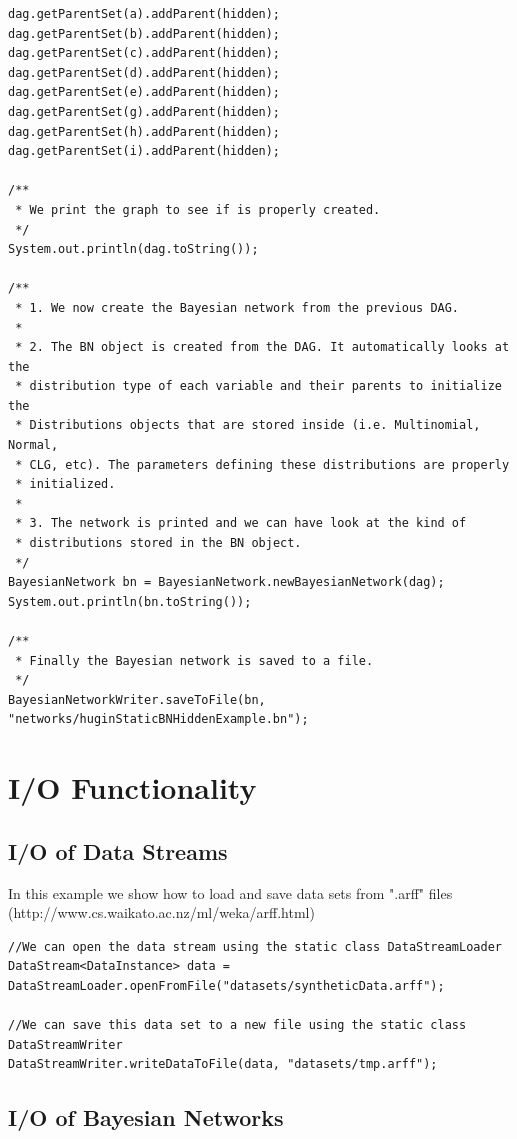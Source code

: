 \begin{lstlisting}
dag.getParentSet(a).addParent(hidden);
dag.getParentSet(b).addParent(hidden);
dag.getParentSet(c).addParent(hidden);
dag.getParentSet(d).addParent(hidden);
dag.getParentSet(e).addParent(hidden);
dag.getParentSet(g).addParent(hidden);
dag.getParentSet(h).addParent(hidden);
dag.getParentSet(i).addParent(hidden);

/**
 * We print the graph to see if is properly created.
 */
System.out.println(dag.toString());

/**
 * 1. We now create the Bayesian network from the previous DAG.
 *
 * 2. The BN object is created from the DAG. It automatically looks at the 
 * distribution type of each variable and their parents to initialize the 
 * Distributions objects that are stored inside (i.e. Multinomial, Normal, 
 * CLG, etc). The parameters defining these distributions are properly 
 * initialized.
 *
 * 3. The network is printed and we can have look at the kind of 
 * distributions stored in the BN object.
 */
BayesianNetwork bn = BayesianNetwork.newBayesianNetwork(dag);
System.out.println(bn.toString());

/**
 * Finally the Bayesian network is saved to a file.
 */
BayesianNetworkWriter.saveToFile(bn, "networks/huginStaticBNHiddenExample.bn");

\end{lstlisting}


\section{I/O Functionality}

\subsection{I/O of Data Streams}

In this example we show how to load and save data sets from ".arff" files (http://www.cs.waikato.ac.nz/ml/weka/arff.html)

\begin{lstlisting}
//We can open the data stream using the static class DataStreamLoader
DataStream<DataInstance> data = DataStreamLoader.openFromFile("datasets/syntheticData.arff");

//We can save this data set to a new file using the static class DataStreamWriter
DataStreamWriter.writeDataToFile(data, "datasets/tmp.arff");
\end{lstlisting}

\subsection{I/O of Bayesian Networks}

